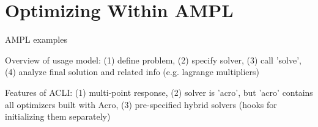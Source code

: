 \section{Optimizing Within AMPL}

AMPL examples

Overview of usage model: (1) define problem, (2) specify solver, (3) call 'solve', (4) analyze final solution and related info (e.g. lagrange multipliers)

Features of ACLI: (1) multi-point response, (2) solver is 'acro', but 'acro' contains all optimizers built with Acro, (3) pre-specified hybrid solvers (hooks for initializing them separately)